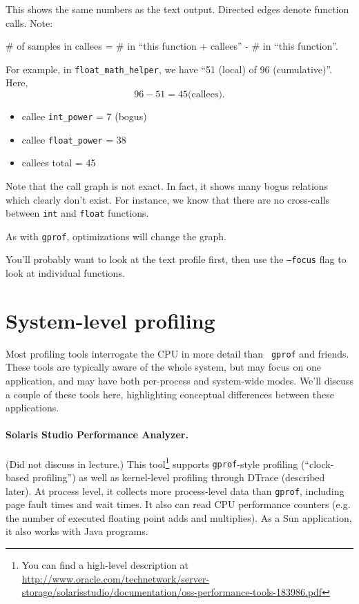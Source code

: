 \documentclass[11pt]{article}
\newenvironment{itemizep}{
 \begin{itemize}
  \setlength{\itemsep}{0pt}
  \setlength{\parsep}{3pt}
  \setlength{\topsep}{3pt}
  \setlength{\partopsep}{0pt}
  \setlength{\leftmargin}{1.5em}
  \setlength{\labelwidth}{1em}
  \setlength{\labelsep}{0.5em} }
 {\end{itemize}}
\begin{document}
This shows the same numbers as the text output. Directed edges denote function calls.
Note: 
\begin{center}
\# of samples in callees = \# in ``this function + callees'' - \# in ``this function''.
\end{center}

For example, in {\tt float\_math\_helper}, we have ``51 (local) of 96 (cumulative)''.
Here,
\[ 96 - 51 = 45 \mbox{(callees)}. \]
      \begin{itemizep}
        \item callee {\tt int\_power} = 7 (bogus)
        \item callee {\tt float\_power} = 38
        \item callees total = 45
      \end{itemizep}

Note that the call graph is not exact.
In fact, it shows many bogus relations which clearly don't exist.
For instance, we know that there are no cross-calls between {\tt int} and {\tt float} functions.

As with {\tt gprof}, optimizations will change the
      graph.\

You'll probably want to look at the text profile first, then use the
      {\tt --focus} flag to look at individual functions.

      \section*{System-level profiling}
Most profiling tools interrogate the CPU in more detail than {\tt
  gprof} and friends. These tools are typically aware of the whole
system, but may focus on one application, and may have both
per-process and system-wide modes. We'll discuss a couple of these
tools here, highlighting conceptual differences between these
applications.

\paragraph{Solaris Studio Performance Analyzer.} (Did not discuss in lecture.) This 
tool\footnote{You can find a high-level description at
  \url{http://www.oracle.com/technetwork/server-storage/solarisstudio/documentation/oss-performance-tools-183986.pdf}}
supports {\tt gprof}-style profiling (``clock-based profiling'') as
well as kernel-level profiling through DTrace (described later). At
process level, it collects more process-level data than {\tt gprof},
including page fault times and wait times. It also can read CPU
performance counters (e.g. the number of executed floating point adds
and multiplies).  As a Sun application, it also works with Java
programs.
\end{document}
